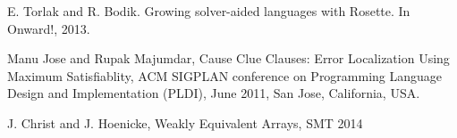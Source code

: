 \documentclass[a4paper, 12pt, notitlepage] {article}
\begin{document}
\begin{thebibliography}{unsrt}
	
	E. Torlak and R. Bodik. Growing solver-aided languages with Rosette. In Onward!, 2013.
	
	Manu Jose and Rupak Majumdar, Cause Clue Clauses: Error Localization Using Maximum Satisfiablity, ACM SIGPLAN conference on Programming Language Design and Implementation (PLDI), June 2011, San Jose, California, USA.
	
	J. Christ and J. Hoenicke, Weakly Equivalent Arrays, SMT 2014
	
\end{thebibliography}
\end{document}
